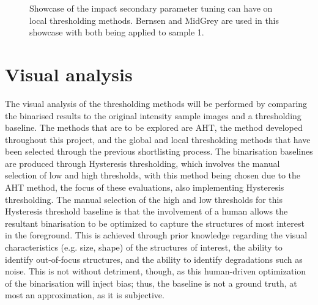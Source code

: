 \begin{figure}
	\caption[Showcase of the impact secondary parameter tuning can have on local thresholding methods.]{Showcase of the impact secondary parameter tuning can have on local thresholding methods. Bernsen and MidGrey are used in this showcase with both being applied to sample 1.}
	\label{fig:local_param_tuning}
\end{figure}

\clearpage
\section{Visual analysis}\label{sec:visual_analysis}
The visual analysis of the thresholding methods will be performed by comparing the binarised results to the original intensity sample images and a thresholding baseline. The methods that are to be explored are AHT, the method developed throughout this project, and the global and local thresholding methods that have been selected through the previous shortlisting process. The binarisation baselines are produced through Hysteresis thresholding, which involves the manual selection of low and high thresholds, with this method being chosen due to the AHT method, the focus of these evaluations, also implementing Hysteresis thresholding. The manual selection of the high and low thresholds for this Hysteresis threshold baseline is that the involvement of a human allows the resultant binarisation to be optimized to capture the structures of most interest in the foreground. This is achieved through prior knowledge regarding the visual characteristics (e.g. size, shape) of the structures of interest, the ability to identify out-of-focus structures, and the ability to identify degradations such as noise. This is not without detriment, though, as this human-driven optimization of the binarisation will inject bias; thus, the baseline is not a ground truth, at most an approximation, as it is subjective. 

